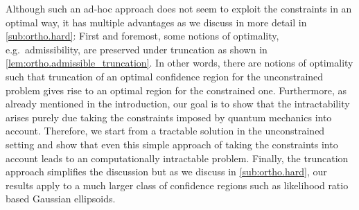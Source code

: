 Although such an ad-hoc approach does not seem to exploit the constraints in an optimal way, it has multiple advantages as we discuss in more detail in \cref{sub:ortho.hard}:
First and foremost, some notions of optimality, e.g.\ admissibility, are preserved under truncation as shown in \cref{lem:ortho.admissible_truncation}.
In other words, there are notions of optimality such that truncation of an optimal confidence region for the unconstrained problem gives rise to an optimal region for the constrained one.
Furthermore, as already mentioned in the introduction, our goal is to show that the intractability arises purely due taking the constraints imposed by quantum mechanics into account.
Therefore, we start from a tractable solution in the unconstrained setting and show that even this simple approach of taking the constraints into account leads to an computationally intractable problem.
Finally, the truncation approach simplifies the discussion but as we discuss in \cref{sub:ortho.hard}, our results apply to a much larger class of confidence regions such as likelihood ratio based Gaussian ellipsoids.\\



